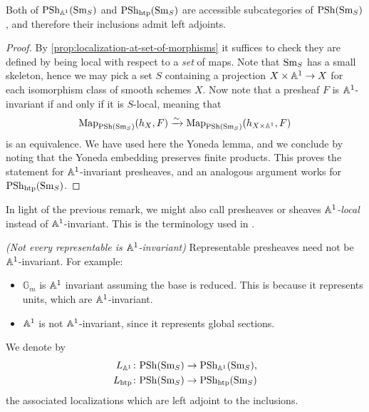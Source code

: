 \documentclass[11pt,openany]{book}
\renewcommand{\Pre}{\mathrm{PSh}}
\begin{document}
\begin{proposition}\label{prop:shv-and-a1-invariant-presheaves-are-accessible-subcats} 
Both of $\Pre_{\A^1}(\Sm_S)$ and $\Pre_{\htp}(\Sm_S)$ are accessible subcategories of $\Pre(\Sm_S)$, and therefore their inclusions admit left adjoints.
\end{proposition}
\begin{proof} By \autoref{prop:localization-at-set-of-morphisms} it suffices to check they are defined by being local with respect to a \textit{set} of maps. Note that $\mathrm{Sm}_S$ has a small skeleton, hence we may pick a set $S$ containing a projection $X \times \mathbb{A}^1 \to X$ for each isomorphism class of smooth schemes $X$. Now note that
a presheaf $F$ is $\mathbb{A}^1$-invariant if and only if it is $S$-local, meaning that
\begin{align*}
    \mathrm{Map}_{\mathrm{PSh}(\mathrm{Sm}_S)}(h_{X},F) \xrightarrow{\sim} \mathrm{Map}_{\mathrm{PSh}(\mathrm{Sm}_S)}(h_{X \times \mathbb{A}^1},F)
\end{align*}
is an equivalence. We have used here the Yoneda lemma, and we conclude by noting that the Yoneda embedding preserves finite products. This proves the statement for $\mathbb{A}^1$-invariant presheaves, and an analogous argument works for $\Pre_{\htp}(\Sm_S)$.
\end{proof}



\begin{terminology} In light of the previous remark, we might also call presheaves or sheaves $\mathbb{A}^1$\textit{-local} instead of $\mathbb{A}^1$-invariant. This is the terminology used in \cite{MV}.
\end{terminology}

\begin{example}\label{ex:non-a1-invt-representables} \textit{(Not every representable is $\mathbb{A}^1$-invariant)} Representable presheaves need not be $\mathbb{A}^1$-invariant. For example:
\begin{itemize}
    \item $\mathbb{G}_m$ is $\mathbb{A}^1$ invariant assuming the base is reduced. This is because it represents units, which are $\mathbb{A}^1$-invariant.
    \item $\mathbb{A}^1$ is not $\mathbb{A}^1$-invariant, since it represents global sections.
\end{itemize}
\end{example}



\begin{notation} We denote by
\begin{align*}
    L_{\mathbb{A}^1} \colon \mathrm{PSh}(\mathrm{Sm}_S) &\to \mathrm{PSh}_{\mathbb{A}^1}(\mathrm{Sm}_S), \\
    L_{\mathrm{htp}} \colon \mathrm{PSh}(\mathrm{Sm}_S) &\to \mathrm{PSh}_{\mathrm{htp}}(\mathrm{Sm}_S)
\end{align*}
the associated localizations which are left adjoint to the inclusions.
\end{notation}
\end{document}
